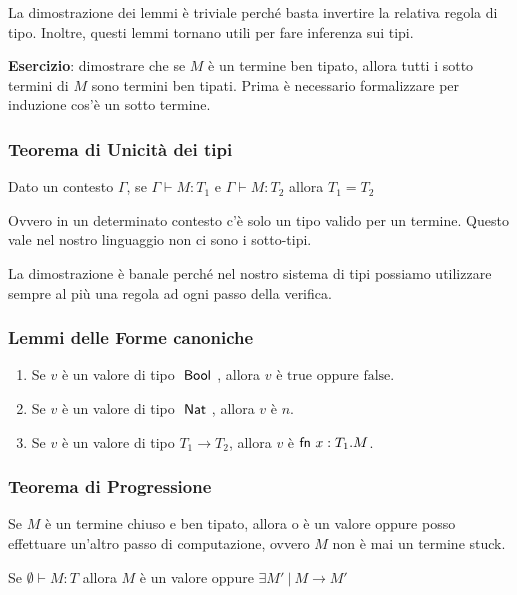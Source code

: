 \noindent La dimostrazione dei lemmi è triviale perché basta invertire la relativa regola di tipo. Inoltre, questi lemmi tornano utili per fare inferenza sui tipi.

\textbf{Esercizio}: dimostrare che se $M$ è un termine ben tipato, allora tutti i sotto termini di $M$ sono termini ben tipati. Prima è necessario formalizzare per induzione cos'è un sotto termine.

\subsubsection{Teorema di Unicità dei tipi}

\begin{center}
	Dato un contesto $\Gamma$, se $\Gamma \vdash M : T_1 $ e $\Gamma \vdash M : T_2$ allora $T_1 = T_2$
\end{center}

\noindent Ovvero in un determinato contesto c'è solo un tipo valido per un termine. Questo vale nel nostro linguaggio non ci sono i sotto-tipi. 

La dimostrazione è banale perché nel nostro sistema di tipi possiamo utilizzare sempre al più una regola ad ogni passo della verifica.


\subsubsection{Lemmi delle Forme canoniche}

\begin{enumerate}
	\item Se $v$ è un valore di tipo $\Bool$, allora $v$ è $\text{true}$ oppure $\text{false}$.
	\item Se $v$ è un valore di tipo $\Nat$, allora $v$ è $n$.
	\item Se $v$ è un valore di tipo $T_1 \rightarrow T_2$, allora $v$ è $\fn x : T_1 . M$.
\end{enumerate}

\subsubsection{Teorema di Progressione}

Se $M$ è un termine chiuso e ben tipato, allora o è un valore oppure posso effettuare un'altro passo di computazione, ovvero $M$ non è mai un termine stuck.

\begin{center}
Se $\emptyset \vdash M : T$ allora $M$ è un valore oppure $\exists M' \: | \: M \rightarrow M'$
\end{center}

